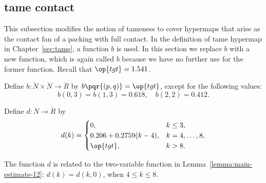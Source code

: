 \subsection{tame contact}

This subsection modifies the notion of tameness to cover hypermaps
that arise as the contact fan of a packing with full contact.  In the
definition of tame hypermap in Chapter~\ref{sec:tame}, a function $b$
is used.  In this section we replace $b$ with a new function, which is
again called $b$ because we have no further use for the former
function.  Recall that $\op{tgt}=1.541$.  %
%

\begin{definition}[b]
  Define $b:\ring{N}\times \ring{N}\to \ring{R}$ by
  $b\pqr{(p,q)}=\op{tgt}$, except for the following values:
\[
b(0,3)=b(1,3)=0.618,\quad b(2,2)=0.412.
\]
\end{definition}
%

\begin{definition}[d]
Define $d:\ring{N}\to \ring{R}$ by
\[d(k) = \begin{cases}
0, & k\le 3, \\
0.206 + 0.2759 (k-4),& k=4,\ldots,8,\\
\op{tgt},& k>8.\\
\end{cases}
\]
\end{definition}
%

The function $d$ is related to the two-variable function in
Lemma~\ref{lemma:main-estimate-12}: $d(k) = d(k,0)$, when $4\le k\le
8$.

